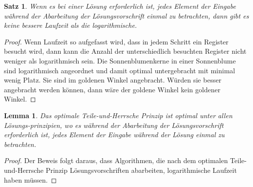 \documentclass{scrartcl}
\newtheorem{satz}{Satz}[section]
\newtheorem{lemma}{Lemma}[section]
\begin{document}
\begin{satz}
Wenn es bei einer Lösung erforderlich ist, jedes Element der Eingabe während der Abarbeitung der Lösungsvorschrift einmal zu betrachten, dann gibt es keine bessere Laufzeit als die logarithmische.
\end{satz}
\begin{proof}
	Wenn Laufzeit so aufgefasst wird, dass in jedem Schritt ein Register besucht wird, dann kann die Anzahl der unterschiedlich besuchten Register nicht weniger als logarithmisch sein. Die Sonnenblumenkerne in einer Sonnenblume sind logarithmisch angeordnet und damit optimal untergebracht mit minimal wenig Platz. Sie sind im goldenen Winkel angebracht. Würden sie besser angebracht werden können, dann wäre der goldene Winkel kein goldener Winkel.
\end{proof}

\begin{lemma}
	Das optimale Teile-und-Herrsche Prinzip ist optimal unter allen Lösungs-prinzipien, wo es während der Abarbeitung der Lösungsvorschrift erforderlich ist, jedes Element der Eingabe während der Lösung einmal zu betrachten.
\end{lemma}
\begin{proof}
	Der Beweis folgt daraus, dass Algorithmen, die nach dem optimalen Teile-und-Herrsche Prinzip Lösungsvorschriften abarbeiten, logarithmische Laufzeit haben müssen. 
\end{proof}
\end{document}
